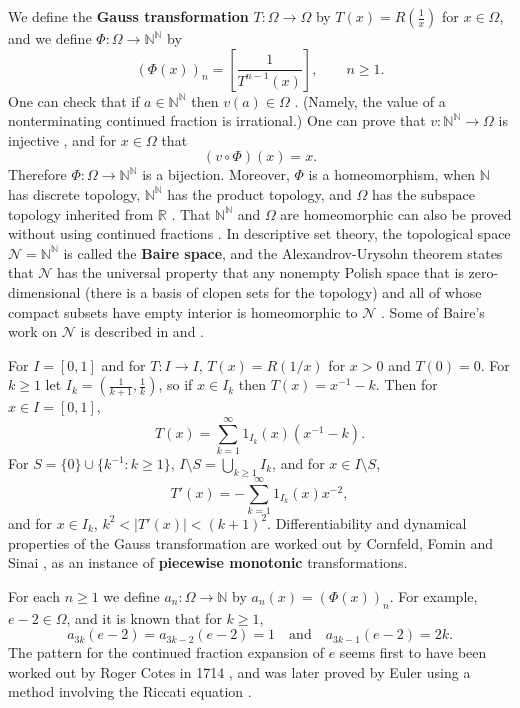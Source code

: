 \documentclass{article}
\begin{document}
We define the \textbf{Gauss transformation} $T:\Omega \to \Omega$ by
 $T(x)=R\left(\frac{1}{x}\right)$ for $x \in \Omega$, and we define $\Phi:\Omega \to \mathbb{N}^\mathbb{N}$ by
\[
(\Phi(x))_n=\left[ \frac{1}{T^{n-1}(x)} \right],\qquad n \geq 1.
\]
One can check that if $a \in \mathbb{N}^\mathbb{N}$ then $v(a) \in \Omega$ \cite[p.~73, Lemma 3.2]{einsiedler}. (Namely, the value of a nonterminating continued fraction is irrational.)
One can prove that $v:\mathbb{N}^\mathbb{N} \to \Omega$ is injective \cite[p.~75, Lemma 3.4]{einsiedler}, and
 for $x \in \Omega$ that \cite[p.~78, Lemma 3.6]{einsiedler}
 \[
 (v \circ \Phi)(x)=x.
 \]
 Therefore $\Phi:\Omega \to \mathbb{N}^\mathbb{N}$ is a bijection. Moreover,
 $\Phi$ is a homeomorphism, when $\mathbb{N}$ has discrete topology, $\mathbb{N}^\mathbb{N}$ has the product topology, and $\Omega$ has the subspace topology
 inherited from $\mathbb{R}$ \cite[p.~86, Exercise 3.2.2]{einsiedler}. That $\mathbb{N}^\mathbb{N}$ and $\Omega$ are homeomorphic
 can also be proved without using continued fractions \cite[p.~106, Theorem 3.68]{hitchhiker}.
 In descriptive set theory,
 the topological space $\mathscr{N}=\mathbb{N}^\mathbb{N}$
 is  called the \textbf{Baire space}, and the Alexandrov-Urysohn theorem states that $\mathscr{N}$ has the universal property  that any nonempty
 Polish space that is zero-dimensional (there is a basis of clopen sets for the topology) and all of whose compact subsets have empty
 interior is homeomorphic to $\mathscr{N}$  \cite[p.~37, Theorem 7.7]{kechris}.
 Some of Baire's work on $\mathscr{N}$ is described in \cite[pp.~119--120]{johnson} and \cite[pp.~349, 372]{arboleda}.

For $I=[0,1]$ and for $T:I \to I$, $T(x)=R(1/x)$ for $x>0$ and $T(0)=0$. For $k \geq 1$ let 
$I_k = \left( \frac{1}{k+1},\frac{1}{k} \right)$, so if $x \in I_k$ then $T(x) = x^{-1}-k$. Then for
$x \in I=[0,1]$,
\[
T(x) = \sum_{k=1}^\infty 1_{I_k}(x) (x^{-1}-k).
\]
For $S = \{0\} \cup \{k^{-1} : k \geq 1\}$, $I \setminus S = \bigcup_{k \geq 1} I_k$, and for $x \in I \setminus S$,
\[
T'(x) = - \sum_{k=1}^\infty 1_{I_k}(x) x^{-2},
\]
and for $x \in I_k$, $k^2 < |T'(x)| < (k+1)^2$. Differentiability and dynamical properties of the Gauss transformation are worked out
by Cornfeld, Fomin and Sinai \cite[pp.~165--177, Chapter 7, \S 4]{cornfeld},
as an instance of \textbf{piecewise monotonic} transformations.




For each $n \geq 1$ we define $a_n:\Omega \to \mathbb{N}$ by $a_n(x)=(\Phi(x))_n$.
For example, $e-2 \in \Omega$, and it is known \cite[p.~74, Theorem 2]{MR0209227} 
that for $k \geq 1$,
\[
a_{3k}(e-2)=a_{3k-2}(e-2)=1 \quad \textrm{and} \quad a_{3k-1}(e-2)=2k.
\]
The pattern for the continued fraction expansion of $e$ seems first to have been worked out by
Roger Cotes in 1714 \cite{fowler1992}, and was  later proved by Euler using a method involving the Riccati equation \cite{cretney}.
\end{document}
